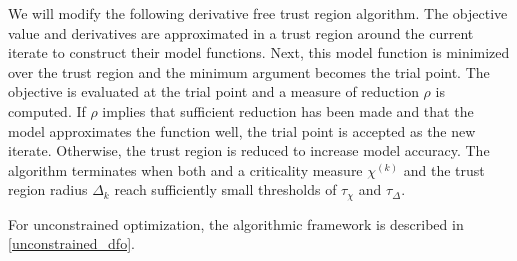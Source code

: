 \documentclass{article}
\theoremstyle{case}
\newcommand{\chik}{{\chi^{(k)}}}
\begin{document}
We will modify the following derivative free trust region algorithm.
The objective value and derivatives are approximated in a trust region around the current iterate to construct their model functions.
Next, this model function is minimized over the trust region and the minimum argument becomes the trial point.
The objective is evaluated at the trial point and a measure of reduction $\rho$ is computed.
If $\rho$ implies that sufficient reduction has been made and that the model approximates the function well, the trial point is accepted as the new iterate.
Otherwise, the trust region is reduced to increase model accuracy.
The algorithm terminates when both and a criticality measure $\chik$ and the trust region radius $\Delta_k$ reach sufficiently small thresholds of $\tau_{\chi}$ and $\tau_{\Delta}$.


For unconstrained optimization, the algorithmic framework is described in \cref{unconstrained_dfo}.
\end{document}

